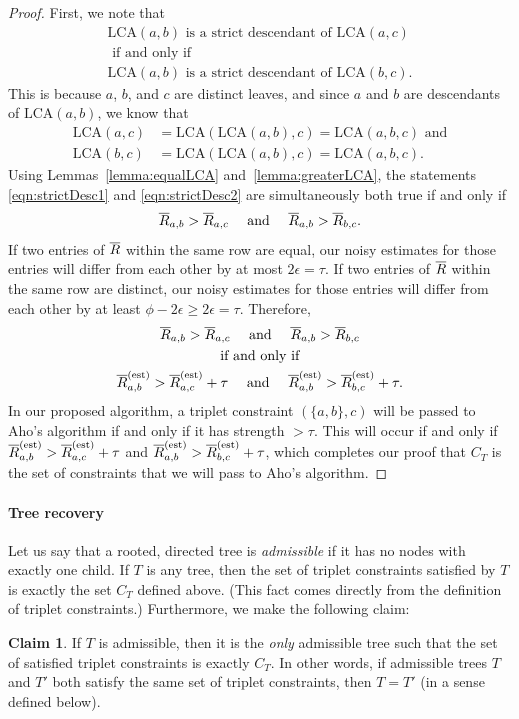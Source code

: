 \documentclass{article}
\theoremstyle{definition}
\newtheorem{claim}[thm]{Claim}
\newcommand{\LCA}{\text{LCA}}
\newcommand{\RbarEst}{\Rbar^\text{(est)}}
\begin{document}
\begin{proof}
First, we note that
\begin{gather}
\LCA(a,b) \text{ is a strict descendant of } \LCA(a,c) \label{eqn:strictDesc1} \\
\text{ if and only if } \nonumber \\
\LCA(a,b) \text{ is a strict descendant of } \LCA(b,c). \label{eqn:strictDesc2}
\end{gather}
This is because $a$, $b$, and $c$ are distinct leaves, and since $a$ and $b$ are descendants of $\LCA(a,b)$, we know that
\begin{align*}
\LCA(a,c) &= \LCA(\LCA(a,b),c) = \LCA(a,b,c) \text{ and} \\
\LCA(b,c) &= \LCA(\LCA(a,b),c) = \LCA(a,b,c).
\end{align*}
Using Lemmas~\ref{lemma:equalLCA} and~\ref{lemma:greaterLCA}, the statements \eqref{eqn:strictDesc1} and \eqref{eqn:strictDesc2} are simultaneously both true if and only if
\begin{gather*}
\overline{R}_{a,b} > \overline{R}_{a,c}
\quad \text{ and } \quad
\overline{R}_{a,b} > \overline{R}_{b,c}.
\end{gather*}
If two entries of $\overline{R}$ within the same row are equal, our noisy estimates for those entries will differ from each other by at most $2\epsilon = \tau$.
If two entries of $\overline{R}$ within the same row are distinct, our noisy estimates for those entries will differ from each other by at least $\phi - 2\epsilon \geq 2\epsilon = \tau$.
Therefore,
\begin{gather*}
\Rbar_{a,b} > \Rbar_{a,c}
\quad \text{ and } \quad
\Rbar_{a,b} > \Rbar_{b,c} \\
%
\text{ if and only if } \\
%
\RbarEst_{a,b} > \RbarEst_{a,c} + \tau
\quad \text{ and } \quad
\RbarEst_{a,b} > \RbarEst_{b,c} + \tau.
\end{gather*}
In our proposed algorithm, a triplet constraint $(\{a,b\},c)$ will be passed to Aho's algorithm if and only if it has strength $> \tau$.
This will occur if and only if $\RbarEst_{a,b} > \RbarEst_{a,c} + \tau$ and $\RbarEst_{a,b} > \RbarEst_{b,c} + \tau$, which completes our proof that $C_T$ is the set of constraints that we will pass to Aho's algorithm.
\end{proof}

\paragraph{Tree recovery}
Let us say that a rooted, directed tree is \emph{admissible} if it has no nodes with exactly one child.
If $T$ is any tree, then the set of triplet constraints satisfied by $T$ is exactly the set $C_T$ defined above.
(This fact comes directly from the definition of triplet constraints.)
Furthermore, we make the following claim:
\begin{claim}
If $T$ is admissible, then it is the \emph{only} admissible tree such that the set of satisfied triplet constraints is exactly $C_T$.
In other words, if admissible trees $T$ and $T'$ both satisfy the same set of triplet constraints, then $T = T'$ (in a sense defined below).
\end{claim}
\end{document}
